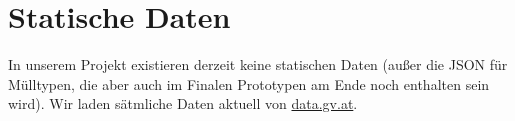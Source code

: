 \documentclass{mrtrash}
\begin{document}
\section{Statische Daten}

In unserem Projekt existieren derzeit keine statischen Daten (außer die JSON für Mülltypen, die aber auch im Finalen Prototypen am Ende noch enthalten sein wird). Wir laden sätmliche Daten aktuell von \href{https://data.gv.at}{data.gv.at}.

%
%
\end{document}
